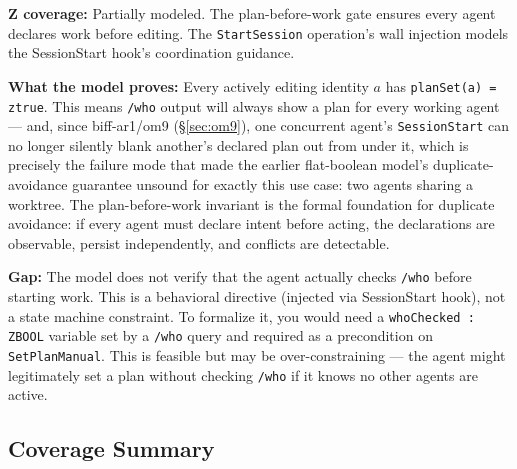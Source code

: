 \documentclass[a4paper,10pt,fleqn]{article}
\begin{document}
\textbf{Z coverage:} Partially modeled. The plan-before-work gate
ensures every agent declares work before editing. The
\texttt{StartSession} operation's wall injection models the SessionStart
hook's coordination guidance.

\textbf{What the model proves:} Every actively editing identity $a$ has
\texttt{planSet(a) = ztrue}. This means \texttt{/who} output will always
show a plan for every working agent --- and, since biff-ar1/om9
(\S\ref{sec:om9}), one concurrent agent's \texttt{SessionStart} can no
longer silently blank another's declared plan out from under it, which
is precisely the failure mode that made the earlier flat-boolean model's
duplicate-avoidance guarantee unsound for exactly this use case: two
agents sharing a worktree. The plan-before-work invariant is the formal
foundation for duplicate avoidance: if every agent must declare intent
before acting, the declarations are observable, persist independently,
and conflicts are detectable.

\textbf{Gap:} The model does not verify that the agent actually checks
\texttt{/who} before starting work. This is a behavioral directive
(injected via SessionStart hook), not a state machine constraint. To
formalize it, you would need a \texttt{whoChecked : ZBOOL} variable
set by a \texttt{/who} query and required as a precondition on
\texttt{SetPlanManual}. This is feasible but may be over-constraining ---
the agent might legitimately set a plan without checking \texttt{/who}
if it knows no other agents are active.

\subsection{Coverage Summary}
\end{document}

